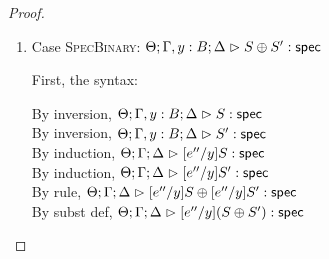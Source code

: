 \begin{proof}
\begin{enumerate}
  For semantics, consider
  $\interp{\judgeS[\Theta; \Gamma; \Delta]
                  {[e''/y](Q \beta:\kappa'.\;S)}}\;\theta\;\gamma\;\delta$ 
  \begin{eqnproof}
          {Semantics}
          {Induction}
          {Semantics}
  \end{eqnproof}


\item Case \textsc{SpecBinary}: $\judgeS[\Theta; \Gamma, y:B; \Delta]{S \oplus S'}$
  
  First, the syntax:
  \begin{tabbedproof}
    \oo By inversion, $\judgeS[\Theta; \Gamma, y:B; \Delta]{S}$\\
    \oo By inversion, $\judgeS[\Theta; \Gamma, y:B; \Delta]{S'}$\\
    \oo By induction, $\judgeS[\Theta; \Gamma; \Delta]{[e''/y]S}$\\
    \oo By induction, $\judgeS[\Theta; \Gamma; \Delta]{[e''/y]S'}$\\
    \oo By rule, $\judgeS[\Theta; \Gamma; \Delta]{[e''/y]S \oplus [e''/y]S'}$\\
    \oo By subst def, $\judgeS[\Theta; \Gamma; \Delta]{[e''/y](S \oplus S')}$\\
  \end{tabbedproof}


\end{enumerate}
\end{proof}
